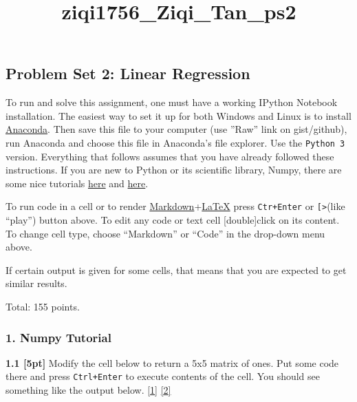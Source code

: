 \documentclass[11pt]{article}
\title{ziqi1756\_Ziqi\_Tan\_ps2}
\begin{document}
    
    
    \maketitle
    
    

    
    \hypertarget{problem-set-2-linear-regression}{%
\subsection{Problem Set 2: Linear
Regression}\label{problem-set-2-linear-regression}}

To run and solve this assignment, one must have a working IPython
Notebook installation. The easiest way to set it up for both Windows and
Linux is to install \href{https://www.continuum.io/downloads}{Anaconda}.
Then save this file to your computer (use ''Raw'' link on gist/github),
run Anaconda and choose this file in Anaconda's file explorer. Use the
\texttt{Python\ 3} version. Everything that follows assumes that you
have already followed these instructions. If you are new to Python or
its scientific library, Numpy, there are some nice tutorials
\href{https://www.learnpython.org/}{here} and
\href{http://www.scipy-lectures.org/}{here}.

To run code in a cell or to render
\href{https://en.wikipedia.org/wiki/Markdown}{Markdown}+\href{https://en.wikipedia.org/wiki/LaTeX}{LaTeX}
press \texttt{Ctr+Enter} or \texttt{{[}\textgreater{}\textbar{}{]}}(like
``play'') button above. To edit any code or text cell {[}double{]}click
on its content. To change cell type, choose ``Markdown'' or ``Code'' in
the drop-down menu above.

If certain output is given for some cells, that means that you are
expected to get similar results.

Total: 155 points.

    \hypertarget{numpy-tutorial}{%
\subsubsection{1. Numpy Tutorial}\label{numpy-tutorial}}

\textbf{1.1 {[}5pt{]}} Modify the cell below to return a 5x5 matrix of
ones. Put some code there and press \texttt{Ctrl+Enter} to execute
contents of the cell. You should see something like the output below.
\href{https://docs.scipy.org/doc/numpy-1.13.0/user/basics.creation.html\#arrays-creation}{{[}1{]}}
\href{https://docs.scipy.org/doc/numpy-1.13.0/reference/routines.array-creation.html\#routines-array-creation}{{[}2{]}}
\end{document}
